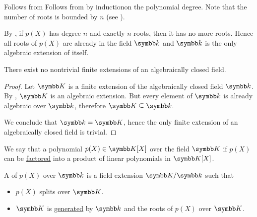 \begin{RefListProof}
     Follows from  Follows from  by induction\IND on the polynomial degree. Note that the number of roots is bounded by \( n \) (see ).

     By , if \( p(X) \) has degree \( n \) and exactly \( n \) roots, then it has no more roots. Hence all roots of \( p(X) \) are already in the field \( \Bk \) and \( \Bk \) is the only algebraic extension of itself.
\end{RefListProof}

\begin{Proposition}\label{thm:no_finite_extensions_of_closed_fields}
  There exist no nontrivial finite extensions of an algebraically closed field.
\end{Proposition}
\begin{proof}
  Let \( \BK \) is a finite extension of the algebraically closed field \( \Bk \). By , \( \BK \) is an algebraic extension. But every element of \( \Bk \) is already algebraic over \( \Bk \), therefore \( \BK \subseteq \Bk \).

  We conclude that \( \Bk = \BK \), hence the only finite extension of an algebraically closed field is trivial.
\end{proof}

\begin{Definition}\label{def:splitting_field}\cite[458]{Knapp2016BAlg}
  We say that a polynomial \( p(X) \in \BK[X] \) over the field \( \BK \)  if \( p(X) \) can be \hyperref[def:factorization_in_ring]{factored} into a product of linear polynomials in \( \BK[X] \).

  A  of \( p(X) \) over \( \Bk \) is a field extension \( \BK / \Bk \) such that
  \begin{itemize}
    \item \( p(X) \) splits over \( \BK \).
    \item \( \BK \) is \hyperref[def:generated_ring_ideal]{generated} by \( \Bk \) and the roots of \( p(X) \) over \( \BK \).
  \end{itemize}
\end{Definition}

